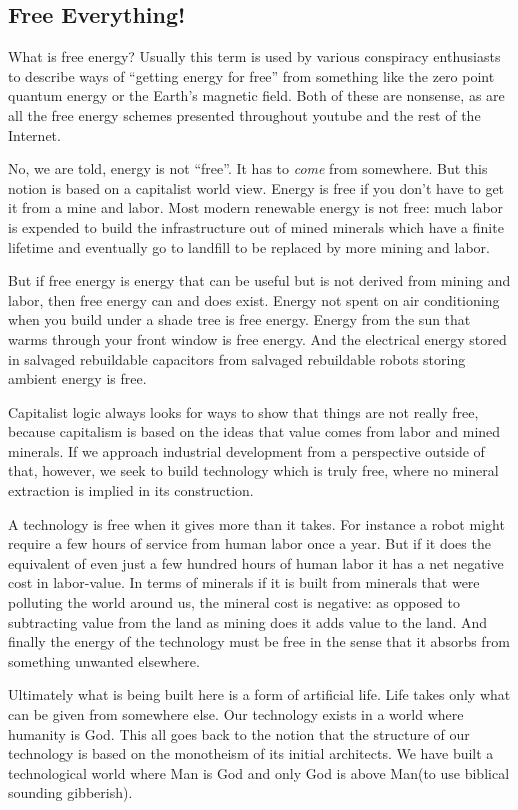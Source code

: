 \subsection{Free Everything!}\label{free-everything}

What is free energy? Usually this term is used by various conspiracy
enthusiasts to describe ways of ``getting energy for free'' from
something like the zero point quantum energy or the Earth's magnetic
field. Both of these are nonsense, as are all the free energy schemes
presented throughout youtube and the rest of the Internet.

No, we are told, energy is not ``free''. It has to \emph{come} from
somewhere. But this notion is based on a capitalist world view. Energy
is free if you don't have to get it from a mine and labor. Most modern
renewable energy is not free: much labor is expended to build the
infrastructure out of mined minerals which have a finite lifetime and
eventually go to landfill to be replaced by more mining and labor.

But if free energy is energy that can be useful but is not derived from
mining and labor, then free energy can and does exist. Energy not spent
on air conditioning when you build under a shade tree is free energy.
Energy from the sun that warms through your front window is free energy.
And the electrical energy stored in salvaged rebuildable capacitors from
salvaged rebuildable robots storing ambient energy is free.

Capitalist logic always looks for ways to show that things are not
really free, because capitalism is based on the ideas that value comes
from labor and mined minerals. If we approach industrial development
from a perspective outside of that, however, we seek to build technology
which is truly free, where no mineral extraction is implied in its
construction.

A technology is free when it gives more than it takes. For instance a
robot might require a few hours of service from human labor once a year.
But if it does the equivalent of even just a few hundred hours of human
labor it has a net negative cost in labor-value. In terms of minerals if
it is built from minerals that were polluting the world around us, the
mineral cost is negative: as opposed to subtracting value from the land
as mining does it adds value to the land. And finally the energy of the
technology must be free in the sense that it absorbs from something
unwanted elsewhere.

Ultimately what is being built here is a form of artificial life. Life
takes only what can be given from somewhere else. Our technology exists
in a world where humanity is God. This all goes back to the notion that
the structure of our technology is based on the monotheism of its
initial architects. We have built a technological world where Man is God
and only God is above Man(to use biblical sounding gibberish).

